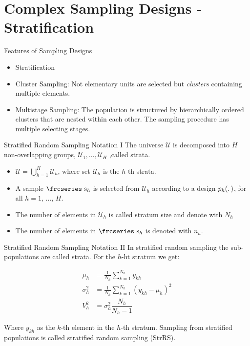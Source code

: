 \documentclass[10pt]{beamer}\usepackage[]{graphicx}\usepackage[]{color}
\newcommand{\eqname}[1]{\tag*{#1}} %
\newcommand{\textfrc}[1]{{\frcseries#1}}
\newcommand{\mathfrc}[1]{\text{\textfrc{#1}}}
\begin{document}
\section{Complex Sampling Designs - Stratification}


\begin{frame}{Features of Sampling Designs}
\begin{itemize}
\item Stratification
\item Cluster Sampling: Not elementary units are selected but \emph{clusters} containing multiple elements. 
\item Multistage Sampling: The population is structured by hierarchically ordered clusters that are nested within each other. The sampling procedure has multiple selecting stages. 
\end{itemize}
\end{frame}

\begin{frame}{Stratified Random Sampling Notation I}
  The universe $\mathcal{U}$ is decomposed into $H$ non-overlapping groups,
  $\mathcal{U}_1,\dots,\mathcal{U}_H$ ,called strata.
  \begin{itemize}
  	\item $\mathcal{U} = \bigcup\limits_{h=1}^H \mathcal{U}_h$, where set $\mathcal{U}_h$ is
  the $h$-th
  strata. 
  	\item A sample $\mathfrc{s}_{h}$ is selected from $\mathcal{U}_h$ according to a design
  $p_h(\ldotp)$, for all $h=1,\,\ldots,\,H$. 
  	\item The number of elements in $\mathcal{U}_h$ is called stratum size and denote
  with $N_h$
  	\item The number of elements in $\mathfrc{s}_{h}$ is denoted with $n_h$.
  \end{itemize}
\end{frame}

\begin{frame}{Stratified Random Sampling Notation II}
  In stratified random sampling the sub-populations are called strata. For the  $h$-ht stratum
  we get:
  
  \begin{align}
  \mu_{h}      &= \frac{1}{N_h} \sum^{N_h}_{k=1} y_{kh} \eqname{mean of stratum h} \\
  \sigma^2_{h} &= \frac{1}{N_h}\sum^{N_h}_{k=1} (y_{kh}-\mu_{h})^2  \eqname{variance of stratum $h$} \\
  V^2_{h} & = \sigma^2_{h} \dfrac{N_h}{N_h-1} \nonumber
  \end{align}
  
  Where  $y_{kh}$ as the $k$-th element in the $h$-th stratum.
  Sampling from stratified populations is called stratified random sampling (StrRS).
  
\end{frame}
\end{document}

